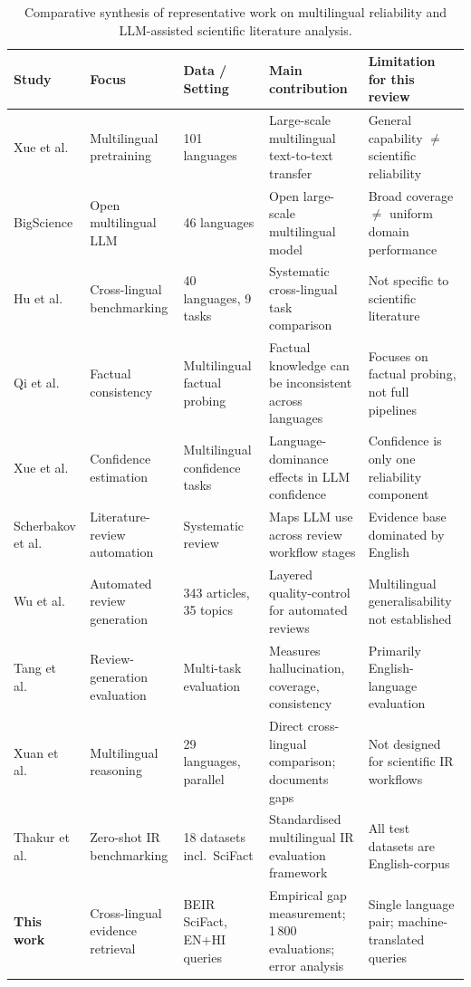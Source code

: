 \documentclass[acmsmall,screen,review]{acmart}
\begin{document}
\begin{table}[t]
\centering
\small
\caption{Comparative synthesis of representative work on multilingual
reliability and LLM-assisted scientific literature analysis.}
\label{tab:comparative}
\begin{tabularx}{\textwidth}{@{}p{}
                               p{}
                               p{}
                               X
                               p{}@{}}
\toprule
\textbf{Study} & \textbf{Focus} & \textbf{Data / Setting} &
\textbf{Main contribution} & \textbf{Limitation for this review} \\
\midrule
Xue et al.\ \citep{xue2021mt5} &
Multilingual pretraining & 101 languages &
Large-scale multilingual text-to-text transfer &
General capability $\neq$ scientific reliability \\
BigScience \citep{bigscience2022bloom} &
Open multilingual LLM & 46 languages &
Open large-scale multilingual model &
Broad coverage $\neq$ uniform domain performance \\
Hu et al.\ \citep{hu2020xtreme} &
Cross-lingual benchmarking & 40 languages, 9 tasks &
Systematic cross-lingual task comparison &
Not specific to scientific literature \\
Qi et al.\ \citep{qi2023crosslingual} &
Factual consistency & Multilingual factual probing &
Factual knowledge can be inconsistent across languages &
Focuses on factual probing, not full pipelines \\
Xue et al.\ \citep{xue2024mlingconf} &
Confidence estimation & Multilingual confidence tasks &
Language-dominance effects in LLM confidence &
Confidence is only one reliability component \\
Scherbakov et al.\ \citep{scherbakov2025emergence} &
Literature-review automation & Systematic review &
Maps LLM use across review workflow stages &
Evidence base dominated by English \\
Wu et al.\ \citep{wu2025automated} &
Automated review generation & 343 articles, 35 topics &
Layered quality-control for automated reviews &
Multilingual generalisability not established \\
Tang et al.\ \citep{tang2025automated} &
Review-generation evaluation & Multi-task evaluation &
Measures hallucination, coverage, consistency &
Primarily English-language evaluation \\
Xuan et al.\ \citep{xuan2025mmlupro} &
Multilingual reasoning & 29 languages, parallel &
Direct cross-lingual comparison; documents gaps &
Not designed for scientific IR workflows \\
Thakur et al.\ \citep{thakur2021beir} &
Zero-shot IR benchmarking & 18 datasets incl.\ SciFact &
Standardised multilingual IR evaluation framework &
All test datasets are English-corpus \\
\midrule
\textbf{This work} &
Cross-lingual evidence retrieval &
BEIR SciFact, EN+HI queries &
Empirical gap measurement; 1\,800 evaluations;
error analysis & Single language pair; machine-translated queries \\
\bottomrule
\end{tabularx}
\end{table}
\end{document}
